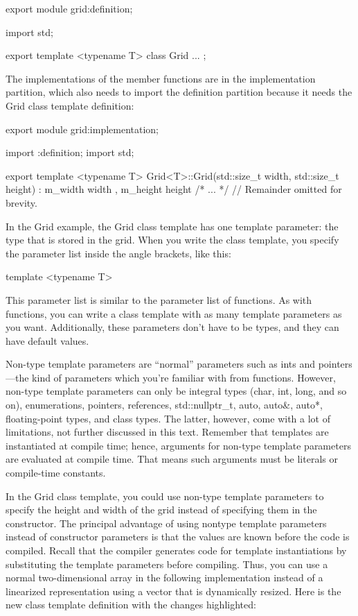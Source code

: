 \begin{cpp}
export module grid:definition;

import std;

export template <typename T> class Grid { ... };
\end{cpp}

The implementations of the member functions are in the implementation partition, which also needs to import the definition partition because it needs the Grid class template definition:

\begin{cpp}
export module grid:implementation;

import :definition;
import std;

export template <typename T>
Grid<T>::Grid(std::size_t width, std::size_t height)
    : m_width { width }, m_height { height }
{ /* ... */ }
// Remainder omitted for brevity.
\end{cpp}


In the Grid example, the Grid class template has one template parameter: the type that is stored in the grid. When you write the class template, you specify the parameter list inside the angle brackets, like this:

\begin{cpp}
template <typename T>
\end{cpp}

This parameter list is similar to the parameter list of functions. As with functions, you can write a class template with as many template parameters as you want. Additionally, these parameters don’t have to be types, and they can have default values.


Non-type template parameters are “normal” parameters such as ints and pointers—the kind of parameters which you’re familiar with from functions. However, non-type template parameters can only be integral types (char, int, long, and so on), enumerations, pointers, references, std::nullptr\_t, auto, auto\&, auto*, floating-point types, and class types. The latter, however, come with a lot of limitations, not further discussed in this text. Remember that templates are instantiated at compile time; hence, arguments for non-type template parameters are evaluated at compile time. That means such arguments must be literals or compile-time constants.

In the Grid class template, you could use non-type template parameters to specify the height and width of the grid instead of specifying them in the constructor. The principal advantage of using nontype template parameters instead of constructor parameters is that the values are known before the code is compiled. Recall that the compiler generates code for template instantiations by substituting the template parameters before compiling. Thus, you can use a normal two-dimensional array in the following implementation instead of a linearized representation using a vector that is dynamically resized. Here is the new class template definition with the changes highlighted:

